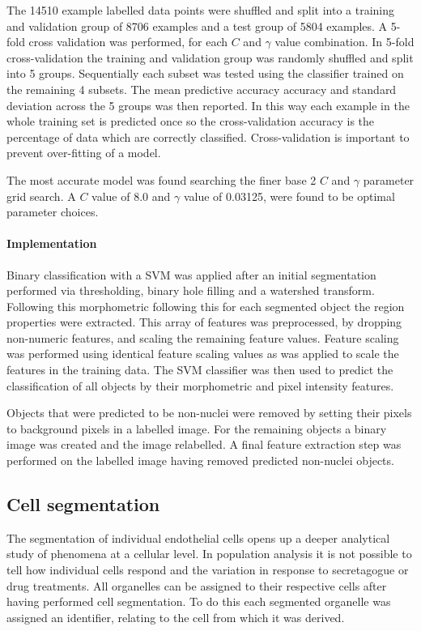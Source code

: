 The 14510 example labelled data points were shuffled and split into a training and validation group of 8706 examples and a test group of 5804 examples. A 5-fold cross validation was performed, for each $C$ and $\gamma$ value combination. In 5-fold cross-validation the training and validation group was randomly shuffled and split into 5 groups. Sequentially each subset was tested using the classifier trained on the remaining 4 subsets. The mean predictive accuracy accuracy and standard deviation across the 5 groups was then reported. In this way each example in the whole training set is predicted once so the cross-validation accuracy is the percentage of data which are correctly classified. Cross-validation is important to prevent over-fitting of a model.

The most accurate model was found searching the finer base 2 $C$ and $\gamma$ parameter grid search. A $C$ value of 8.0 and $\gamma$ value of 0.03125, were found to be optimal parameter choices.

\paragraph{Implementation}
Binary classification with a SVM was applied after an initial segmentation performed via thresholding, binary hole filling and a watershed transform. Following this morphometric following this for each segmented object the region properties were extracted. This array of features was preprocessed, by dropping non-numeric features, and scaling the remaining feature values. Feature scaling was performed using identical feature scaling values as was applied to scale the features in the training data. The SVM classifier was then used to predict the classification of all objects by their morphometric and pixel intensity features.

Objects that were predicted to be non-nuclei were removed by setting their pixels to background pixels in a labelled image. For the remaining objects a binary image was created and the image relabelled. A final feature extraction step was performed on the labelled image having removed predicted non-nuclei objects.

\subsection{Cell segmentation}
\label{endothelial_morphometry:image_processing:cell}
The segmentation of individual endothelial cells opens up a deeper analytical study of phenomena at a cellular level. In population analysis it is not possible to tell how individual cells respond and the variation in response to secretagogue or drug treatments. All organelles can be assigned to their respective cells after having performed cell segmentation. To do this each segmented organelle was assigned an identifier, relating to the cell from which it was derived. 

